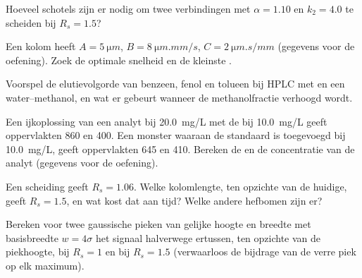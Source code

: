 \begin{exercise}[$\star\star$]\label{exo:b2:chromatography:6}
Hoeveel schotels zijn er nodig om twee verbindingen met $\alpha = 1.10$ en $k_2 = 4.0$ te scheiden bij
$R_s = 1.5$?
\end{exercise}

\begin{exercise}[$\star\star$]\label{exo:b2:chromatography:7}
Een kolom heeft $A = \qty{5}{\micro m}$, $B = \qty{8}{\micro m.mm/s}$, $C = \qty{2}{\micro m.s/mm}$
(gegevens voor de oefening). Zoek de optimale snelheid en de kleinste .
\end{exercise}

\begin{exercise}[$\star\star$]\label{exo:b2:chromatography:8}
Voorspel de elutievolgorde van benzeen, fenol en tolueen bij HPLC met  en een 
water--methanol, en wat er gebeurt wanneer de methanolfractie verhoogd wordt.
\end{exercise}

\begin{exercise}[$\star\star$]\label{exo:b2:chromatography:9}
Een ijkoplossing van een analyt bij \qty{20.0}{mg/L} met de  bij \qty{10.0}{mg/L}
geeft oppervlakten 860 en 400. Een monster waaraan de standaard is toegevoegd bij \qty{10.0}{mg/L}, geeft oppervlakten 645 en 410.
Bereken de  en de concentratie van de analyt (gegevens voor de oefening).
\end{exercise}

\begin{exercise}[$\star\star\star$]\label{exo:b2:chromatography:10}
Een scheiding geeft $R_s = 1.06$. Welke kolomlengte, ten opzichte van de huidige, geeft $R_s = 1.5$, en
wat kost dat aan tijd? Welke andere hefbomen zijn er?
\end{exercise}

\begin{exercise}[$\star\star\star$]\label{exo:b2:chromatography:11}
Bereken voor twee gaussische pieken van gelijke hoogte en breedte met basisbreedte $w = 4\sigma$ het signaal
halverwege ertussen, ten opzichte van de piekhoogte, bij $R_s = 1$ en bij $R_s = 1.5$ (verwaarloos de bijdrage van de verre
piek op elk maximum).
\end{exercise}

